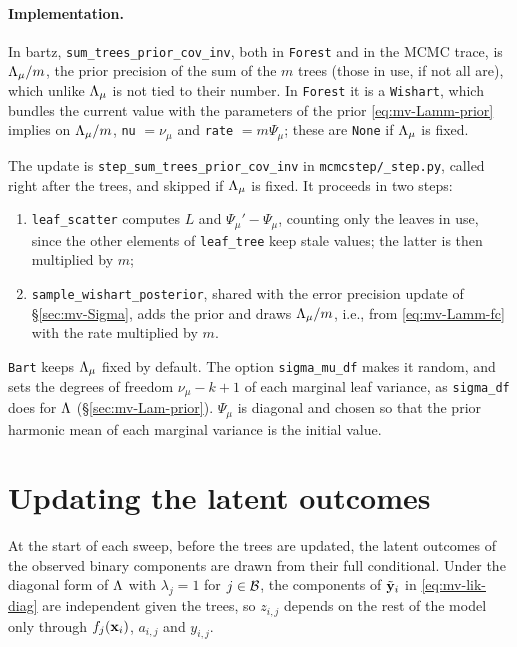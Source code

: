 \paragraph{Implementation.}
In bartz, \texttt{sum\_trees\_prior\_cov\_inv}, both in \texttt{Forest} and in
the MCMC trace, is $\Lambda_{\mu} / m$, the prior precision of the sum of the $m$
trees (those in use, if not all are), which unlike $\Lambda_{\mu}$ is not tied to
their number. In \texttt{Forest} it is a \texttt{Wishart}, which bundles the
current value with the parameters of the prior \eqref{eq:mv-Lamm-prior} implies
on $\Lambda_{\mu} / m$, \texttt{nu} $= \nu_\mu$ and \texttt{rate} $= m \Psi_\mu$;
these are \texttt{None} if $\Lambda_{\mu}$ is fixed.

The update is \texttt{step\_sum\_trees\_prior\_cov\_inv} in
\texttt{mcmcstep/\_step.py}, called right after the trees, and skipped if
$\Lambda_{\mu}$ is fixed. It proceeds in two steps:
\begin{enumerate}
	\item \texttt{leaf\_scatter} computes $L$ and $\Psi_\mu' - \Psi_\mu$,
	      counting only the leaves in use, since the other elements of
	      \texttt{leaf\_tree} keep stale values; the latter is then
	      multiplied by $m$;
	\item \texttt{sample\_wishart\_posterior}, shared with the error precision
	      update of \S\ref{sec:mv-Sigma}, adds the prior and draws
	      $\Lambda_{\mu} / m$, i.e., from \eqref{eq:mv-Lamm-fc} with the rate
	      multiplied by $m$.
\end{enumerate}

\texttt{Bart} keeps $\Lambda_{\mu}$ fixed by default. The option
\texttt{sigma\_mu\_df} makes it random, and sets the degrees of freedom
$\nu_\mu - k + 1$ of each marginal leaf variance, as \texttt{sigma\_df} does
for $\Lambda$ (\S\ref{sec:mv-Lam-prior}). $\Psi_\mu$ is diagonal and chosen so
that the prior harmonic mean of each marginal variance is the initial value.

\section{Updating the latent outcomes}
\label{sec:mv-z}

At the start of each sweep, before the trees are updated, the latent
outcomes of the observed binary components are drawn from their full
conditional. Under the diagonal
form of $\Lambda$ with $\lambda_j = 1$ for $j \in \mathcal{B}$, the components of
$\tilde{\mathbf{y}}_i$ in \eqref{eq:mv-lik-diag} are independent given the trees, so
$z_{i,j}$ depends on the rest of the model only through $f_j(\mathbf{x}_i)$,
$a_{i,j}$ and $y_{i,j}$.

